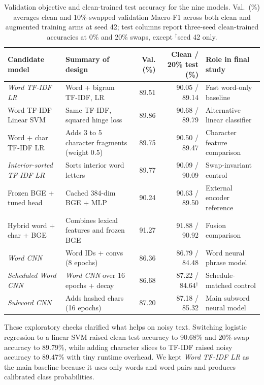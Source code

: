 \begin{table}[H]
\centering\small\setlength{\tabcolsep}{4pt}
\begin{tabularx}{\linewidth}{@{}>{\raggedright\arraybackslash}p{36mm}>{\raggedright\arraybackslash}p{38mm}rr>{\raggedright\arraybackslash}X@{}}
\toprule
Candidate model & Summary of design & Val. (\%) & Clean / 20\% test (\%) & Role in final study \\
\midrule
\textit{Word TF-IDF LR} & Word + bigram TF-IDF, LR & 89.51 & 90.05 / 89.14 & Fast word-only baseline \\
Word TF-IDF Linear SVM & Same TF-IDF, squared hinge loss & 89.86 & 90.68 / 89.79 & Alternative linear classifier \\
Word + char TF-IDF LR & Adds 3 to 5 character fragments (weight 0.5) & 89.75 & 90.50 / 89.47 & Character feature comparison \\
\textit{Interior-sorted TF-IDF LR} & Sorts interior word letters & 89.77 & 90.09 / 90.09 & Swap-invariant control \\
Frozen BGE + tuned head & Cached 384-dim BGE + MLP & 90.24 & 90.63 / 89.50 & External encoder reference \\
Hybrid word + char + BGE & Combines lexical features and frozen BGE & 91.27 & 91.88 / 90.92 & Fusion comparison \\
\textit{Word CNN} & Word IDs + convs (8 epochs) & 86.36 & 86.79 / 84.48 & Word neural phrase model \\
\textit{Scheduled Word CNN} & \textit{Word CNN} over 16 epochs + decay & 86.68 & 87.22 / 84.64$^\dagger$ & Schedule-matched control \\
\textit{Subword CNN} & Adds hashed chars (16 epochs) & 87.20 & 87.18 / 85.32 & Main subword neural model \\
\bottomrule
\end{tabularx}
\caption[Explored and selected models]{Validation objective and clean-trained test accuracy for the nine models. Val.\ (\%) averages clean and 10\%-swapped validation Macro-F1 across both clean and augmented training arms at seed 42; test columns report three-seed clean-trained accuracies at 0\% and 20\% swaps, except $^\dagger$seed 42 only.}
\label{tab:explored-models}
\end{table}

These exploratory checks clarified what helps on noisy text. Switching logistic regression to a linear SVM raised clean test accuracy to 90.68\% and 20\%-swap accuracy to 89.79\%, while adding character slices to TF-IDF raised noisy accuracy to 89.47\% with tiny runtime overhead. We kept \textit{Word TF-IDF LR} as the main baseline because it uses only words and word pairs and produces calibrated class probabilities.

